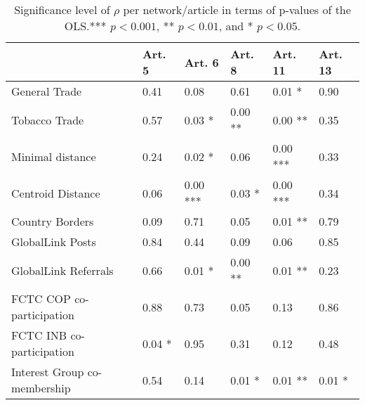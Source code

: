 \begin{table}[ht]
\centering
\begin{tabular}{llllll}
  \toprule
 & Art. 5 & Art. 6 & Art. 8 & Art. 11 & Art. 13 \\ 
  \midrule
General Trade & 0.41   & 0.08   & 0.61   & 0.01 * & 0.90   \\ 
  Tobacco Trade & 0.57   & 0.03 * & 0.00 ** & 0.00 ** & 0.35   \\ 
  Minimal distance & 0.24   & 0.02 * & 0.06   & 0.00 *** & 0.33   \\ 
  Centroid Distance & 0.06   & 0.00 *** & 0.03 * & 0.00 *** & 0.34   \\ 
  Country Borders & 0.09   & 0.71   & 0.05   & 0.01 ** & 0.79   \\ 
  GlobalLink Posts & 0.84   & 0.44   & 0.09   & 0.06   & 0.85   \\ 
  GlobalLink Referrals & 0.66   & 0.01 * & 0.00 ** & 0.01 ** & 0.23   \\ 
  FCTC COP co-participation & 0.88   & 0.73   & 0.05   & 0.13   & 0.86   \\ 
  FCTC INB co-participation & 0.04 * & 0.95   & 0.31   & 0.12   & 0.48   \\ 
   Interest Group co-membership & 0.54   & 0.14   & 0.01 * & 0.01 ** & 0.01 * \\ 
   \bottomrule
\end{tabular}
\caption{Significance level of $\rho$ per network/article in terms of p-values of the OLS.*** $p < 0.001$, ** $p < 0.01$, and * $p < 0.05$.} 
\end{table}
